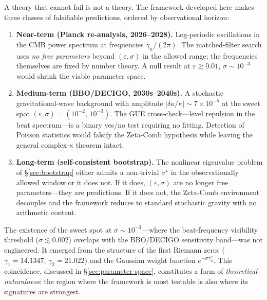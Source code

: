 \documentclass[12pt,a4paper]{article}
\begin{document}
A theory that cannot fail is not a theory.
The framework developed here makes three classes of
falsifiable predictions, ordered by observational horizon:

\begin{enumerate}
  \item \textbf{Near-term (Planck re-analysis, 2026--2028).}
    Log-periodic oscillations in the CMB power spectrum at
    frequencies $\gamma_{n}\!/\!(2\pi)$.
    The matched-filter search uses \emph{no free parameters}
    beyond $(\varepsilon,\sigma)$ in the allowed range; the
    frequencies themselves are fixed by number theory.
    A null result at $\varepsilon \gtrsim 0.01$,
    $\sigma \sim 10^{-3}$ would shrink the viable parameter
    space.

  \item \textbf{Medium-term (BBO/DECIGO, 2030s--2040s).}
    A stochastic gravitational-wave background with
    amplitude $|\delta\kappa/\kappa| \sim 7 \times 10^{-5}$
    at the sweet spot
    $(\varepsilon,\sigma) = (10^{-2},\, 10^{-3})$.
    The GUE cross-check---level repulsion in the beat
    spectrum---is a binary yes/no test requiring no fitting.
    Detection of Poisson statistics would falsify the
    Zeta-Comb hypothesis while leaving the general
    complex-$\kappa$ theorem intact.

  \item \textbf{Long-term (self-consistent bootstrap).}
    The nonlinear eigenvalue problem of
    \S\ref{sec:bootstrap} either admits a non-trivial
    $\sigma^{\star}$ in the observationally allowed window
    or it does not.
    If it does, $(\varepsilon,\sigma)$ are no longer free
    parameters---they are predictions.
    If it does not, the Zeta-Comb environment decouples and
    the framework reduces to standard stochastic gravity
    with no arithmetic content.
\end{enumerate}

The existence of the sweet spot at
$\sigma \sim 10^{-3}$---where the beat-frequency visibility
threshold ($\sigma \lesssim 0.002$) overlaps with the
BBO/DECIGO sensitivity band---was not engineered.
It emerged from the structure of the first Riemann zeros
($\gamma_{1} = 14.1347$, $\gamma_{2} = 21.022$) and the
Gaussian weight function $e^{-\sigma\gamma_{n}^{2}}$.
This coincidence, discussed in \S\ref{sec:parameter-space},
constitutes a form of \emph{theoretical naturalness}: the
region where the framework is most testable is also where
its signatures are strongest.


\end{document}
